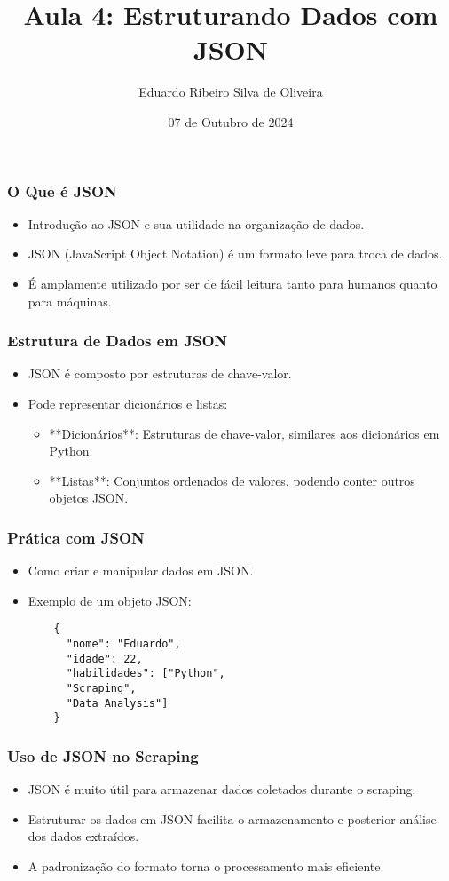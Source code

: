 \documentclass{beamer}
\title{Aula 4: Estruturando Dados com JSON}
\author{Eduardo Ribeiro Silva de Oliveira}
\date{07 de Outubro de 2024}
\begin{document}
\frame{\titlepage}

\begin{frame}
  \frametitle{O Que é JSON}
  \begin{itemize}
    \item Introdução ao JSON e sua utilidade na organização de dados.
    \item JSON (JavaScript Object Notation) é um formato leve para troca de dados.
    \item É amplamente utilizado por ser de fácil leitura tanto para humanos quanto para máquinas.
  \end{itemize}
\end{frame}

\begin{frame}
  \frametitle{Estrutura de Dados em JSON}
  \begin{itemize}
    \item JSON é composto por estruturas de chave-valor.
    \item Pode representar dicionários e listas:
    \begin{itemize}
      \item **Dicionários**: Estruturas de chave-valor, similares aos dicionários em Python.
      \item **Listas**: Conjuntos ordenados de valores, podendo conter outros objetos JSON.
    \end{itemize}
  \end{itemize}
\end{frame}

\begin{frame}[fragile]
  \frametitle{Prática com JSON}
  \begin{itemize}
    \item Como criar e manipular dados em JSON.
    \item Exemplo de um objeto JSON:
    \begin{verbatim}
    {
      "nome": "Eduardo",
      "idade": 22,
      "habilidades": ["Python", 
      "Scraping", 
      "Data Analysis"]
    }
    \end{verbatim}
  \end{itemize}
\end{frame}

\begin{frame}
  \frametitle{Uso de JSON no Scraping}
  \begin{itemize}
    \item JSON é muito útil para armazenar dados coletados durante o scraping.
    \item Estruturar os dados em JSON facilita o armazenamento e posterior análise dos dados extraídos.
    \item A padronização do formato torna o processamento mais eficiente.
  \end{itemize}
\end{frame}
\end{document}
